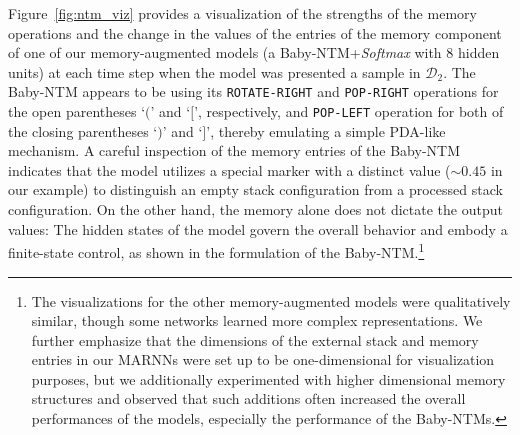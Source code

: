 \documentclass[11pt,a4paper]{article}
\theoremstyle{plain}
\newcommand{\dyck}[1]{\ensuremath{\mathcal{D}_{#1}}}
\begin{document}
Figure~\ref{fig:ntm_viz} provides a visualization of the strengths of the memory operations and the change in the values of the entries of the memory component of one of our memory-augmented models (a Baby-NTM+\textit{Softmax} with $8$ hidden units) at each time step when the model was presented a sample in \dyck{2}.
The Baby-NTM appears to be using its \texttt{ROTATE-RIGHT} and \texttt{POP-RIGHT} operations for the open parentheses `$($' and `$[$', respectively, and \texttt{POP-LEFT} operation for both of the closing parentheses `$)$' and `$]$', thereby emulating a simple PDA-like mechanism. A careful inspection of the memory entries of the Baby-NTM indicates that the model utilizes a special marker with a distinct value (${\sim}0.45$ in our example) to distinguish an empty stack configuration from a processed stack configuration. On the other hand, the memory alone does not dictate the output values: The hidden states of the model govern the overall behavior and embody a finite-state control, as shown in the formulation of the Baby-NTM.\footnote{The visualizations for the other memory-augmented models were qualitatively similar, though some networks learned more complex representations. We further emphasize that the dimensions of the external stack and memory entries in our MARNNs were set up to be one-dimensional for visualization purposes, but we additionally experimented with higher dimensional memory structures and observed that such additions often increased the overall performances of the models, especially the performance of the Baby-NTMs.} 
\end{document}
